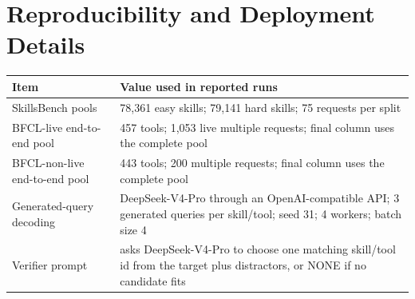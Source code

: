 \documentclass[11pt]{article}
\begin{document}
% 
% 



\section{Reproducibility and Deployment Details}
\label{app:reproducibility}

\begin{table}[t]
\centering
\footnotesize
\setlength{\tabcolsep}{4pt}
\renewcommand{\arraystretch}{1.08}
\begin{tabular}{p{}p{}}
\hline
\textbf{Item} & \textbf{Value used in reported runs} \\
\hline
SkillsBench pools & 78,361 easy skills; 79,141 hard skills; 75 requests per split \\
BFCL-live end-to-end pool & 457 tools; 1,053 live multiple requests; final column uses the complete pool \\
BFCL-non-live end-to-end pool & 443 tools; 200 multiple requests; final column uses the complete pool \\

Generated-query decoding & DeepSeek-V4-Pro through an OpenAI-compatible API; 3 generated queries per skill/tool; seed 31; 4 workers; batch size 4 \\
Verifier prompt & asks DeepSeek-V4-Pro to choose one matching skill/tool id from the target plus distractors, or NONE if no candidate fits \\


\end{tabular}
\end{table}
\end{document}
